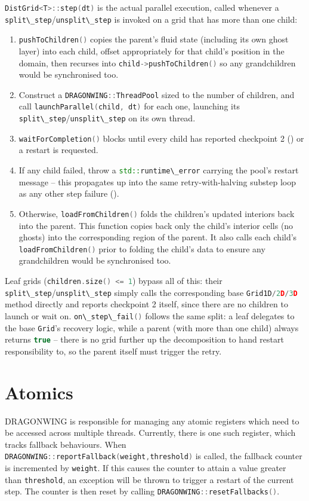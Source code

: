 \documentclass[11pt]{report}
\newcommand{\cpp}[1]{\lstinline[language=C++]{#1}}
\begin{document}
\cpp{DistGrid<T>::step(dt)} is the actual parallel execution, called whenever a \cpp{split\_step}/\cpp{unsplit\_step} is invoked on a grid that has more than one child:
\begin{enumerate}
\item \cpp{pushToChildren()} copies the parent's fluid state (including its own ghost layer) into each child, offset appropriately for that child's position in the domain, then recurses into \cpp{child->pushToChildren()} so any grandchildren would be synchronised too. 
\item Construct a \cpp{DRAGONWING::ThreadPool} sized to the number of children, and call \cpp{launchParallel(child, dt)} for each one, launching its \cpp{split\_step}/\cpp{unsplit\_step} on its own thread.
\item \cpp{waitForCompletion()} blocks until every child has reported checkpoint 2 () or a restart is requested.
\item If any child failed, throw a \cpp{std::runtime\_error} carrying the pool's restart message -- this propagates up into the same retry-with-halving substep loop as any other step failure ().
\item Otherwise, \cpp{loadFromChildren()} folds the children's updated interiors back into the parent. This function copies back only the child's interior cells (no ghosts) into the corresponding region of the parent. It also calls each child's \cpp{loadFromChildren()} prior to folding the child's data to ensure any grandchildren would be synchronised too. 
\end{enumerate}
Leaf grids (\cpp{children.size() <= 1}) bypass all of this: their \cpp{split\_step}/\cpp{unsplit\_step} simply calls the corresponding base \cpp{Grid1D/2D/3D} method directly and reports checkpoint 2 itself, since there are no children to launch or wait on. \cpp{on\_step\_fail()} follows the same split: a leaf delegates to the base \cpp{Grid}'s recovery logic, while a parent (with more than one child) always returns \cpp{true} -- there is no grid further up the decomposition to hand restart responsibility to, so the parent itself must trigger the retry.



\section{Atomics}
\label{sec:atomics}

DRAGONWING is responsible for managing any atomic registers which need to be accessed across multiple threads.
Currently, there is one such register, which tracks fallback behaviours.
When \cpp{DRAGONWING::reportFallback(weight,threshold)} is called, the fallback counter is incremented by \cpp{weight}. If this causes the counter to attain a value greater than \cpp{threshold}, an exception will be thrown to trigger a restart of the current step.
The counter is then reset by calling \cpp{DRAGONWING::resetFallbacks()}.
\end{document}
